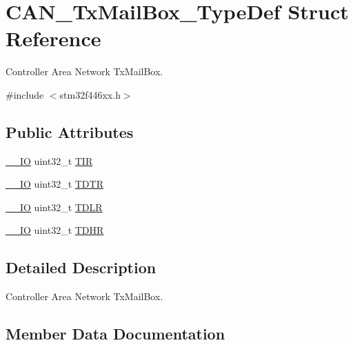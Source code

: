 \hypertarget{struct_c_a_n___tx_mail_box___type_def}{}\section{C\+A\+N\+\_\+\+Tx\+Mail\+Box\+\_\+\+Type\+Def Struct Reference}
\label{struct_c_a_n___tx_mail_box___type_def}


Controller Area Network Tx\+Mail\+Box.  




{\ttfamily \#include $<$stm32f446xx.\+h$>$}

\subsection*{Public Attributes}
\begin{DoxyCompactItemize}
\item 
\hyperlink{core__sc300_8h_aec43007d9998a0a0e01faede4133d6be}{\+\_\+\+\_\+\+IO} uint32\+\_\+t \hyperlink{struct_c_a_n___tx_mail_box___type_def_a22f525c909de2dcec1d4093fe1d562b8}{T\+IR}
\item 
\hyperlink{core__sc300_8h_aec43007d9998a0a0e01faede4133d6be}{\+\_\+\+\_\+\+IO} uint32\+\_\+t \hyperlink{struct_c_a_n___tx_mail_box___type_def_a2351cb865d064cf75f61642aaa887f76}{T\+D\+TR}
\item 
\hyperlink{core__sc300_8h_aec43007d9998a0a0e01faede4133d6be}{\+\_\+\+\_\+\+IO} uint32\+\_\+t \hyperlink{struct_c_a_n___tx_mail_box___type_def_a408c96501b1cc8bd527432736d132a39}{T\+D\+LR}
\item 
\hyperlink{core__sc300_8h_aec43007d9998a0a0e01faede4133d6be}{\+\_\+\+\_\+\+IO} uint32\+\_\+t \hyperlink{struct_c_a_n___tx_mail_box___type_def_a98c6bcd7c9bae378ebf83fd9f5b59020}{T\+D\+HR}
\end{DoxyCompactItemize}


\subsection{Detailed Description}
Controller Area Network Tx\+Mail\+Box. 

\subsection{Member Data Documentation}
